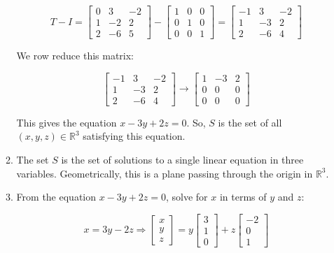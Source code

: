 \documentclass[12pt]{article}
\begin{document}
\begin{enumerate}
\begin{enumerate}
\[
T - I =
\begin{bmatrix}
0 & 3 & -2 \\
1 & -2 & 2 \\
2 & -6 & 5
\end{bmatrix}
-
\begin{bmatrix}
1 & 0 & 0 \\
0 & 1 & 0 \\
0 & 0 & 1
\end{bmatrix}
=
\begin{bmatrix}
-1 & 3 & -2 \\
1 & -3 & 2 \\
2 & -6 & 4
\end{bmatrix}
\]

We row reduce this matrix:

\[
\begin{bmatrix}
-1 & 3 & -2 \\
1 & -3 & 2 \\
2 & -6 & 4
\end{bmatrix}
\longrightarrow
\begin{bmatrix}
1 & -3 & 2 \\
0 & 0 & 0 \\
0 & 0 & 0
\end{bmatrix}
\]

This gives the equation \( x - 3y + 2z = 0 \). So, \( S \) is the set of all \( (x, y, z) \in \mathbb{R}^3 \) satisfying this equation.

\item 
The set \( S \) is the set of solutions to a single linear equation in three variables. Geometrically, this is a plane passing through the origin in \( \mathbb{R}^3 \).

\item 
From the equation \( x - 3y + 2z = 0 \), solve for \( x \) in terms of \( y \) and \( z \):

\[
x = 3y - 2z
\Rightarrow 
\begin{bmatrix}
x \\
y \\
z
\end{bmatrix}
=
y \begin{bmatrix}
3 \\
1 \\
0
\end{bmatrix}
+
z \begin{bmatrix}
-2 \\
0 \\
1
\end{bmatrix}
\]


\end{enumerate}
\end{enumerate}
\end{document}
